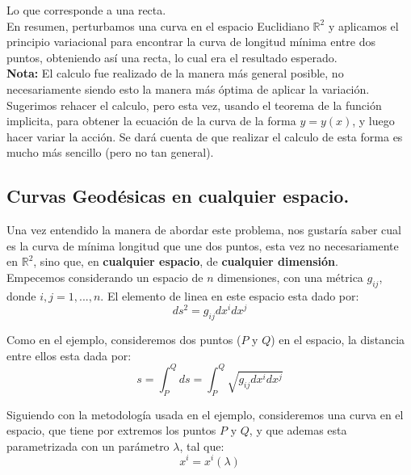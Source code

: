 \documentclass[12pt]{report}
\begin{document}
Lo que corresponde a una recta. \\

En resumen, perturbamos una curva en el espacio Euclidiano $\mathbb{R}^{2}$ y aplicamos el principio variacional para encontrar la curva de 
longitud mínima entre dos puntos, obteniendo as\'i una recta, lo cual era el resultado esperado. \\

\textbf{Nota:} El calculo fue realizado de la manera m\'as general posible, no necesariamente siendo esto la manera m\'as \'optima de 
aplicar la variaci\'on. Sugerimos rehacer el calculo, pero esta vez, usando el teorema de la funci\'on implicita, para obtener la ecuaci\'on 
de la curva de la forma $y=y(x)$, y luego hacer variar la acci\'on. Se dar\'a cuenta de que realizar el calculo de esta forma es mucho m\'as 
sencillo (pero no tan general). \\



\subsection{Curvas Geod\'esicas en cualquier espacio.}

Una vez entendido la manera de abordar este problema, nos gustar\'ia saber cual es la curva de mínima longitud que une dos puntos, 
esta vez no necesariamente en $\mathbb{R}^{2}$, sino que, en \textbf{cualquier espacio}, de \textbf{cualquier dimensi\'on}. \\

Empecemos considerando un espacio de $n$ dimensiones, con una m\'etrica $g_{ij}$, donde $i,j = 1,...,n$. El elemento de linea en este espacio 
esta dado por:
	\begin{equation*}
		ds^{2} = g_{ij}dx^{i}dx^{j}
	\end{equation*}

Como en el ejemplo, consideremos dos puntos ($P$ y $Q$) en el espacio, la distancia entre ellos esta dada por:
	\begin{equation*}
		s = \int^{Q}_{P} ds = \int^{Q}_{P} \sqrt{g_{ij}dx^{i}dx^{j}}
	\end{equation*}

Siguiendo con la metodolog\'ia usada en el ejemplo, consideremos una curva en el espacio, que tiene por extremos los puntos $P$ y $Q$, 
y que ademas esta parametrizada con un parámetro $\lambda$, tal que:
	\begin{equation*}
		x^{i} = x^{i} (\lambda)
	\end{equation*}
\end{document}
